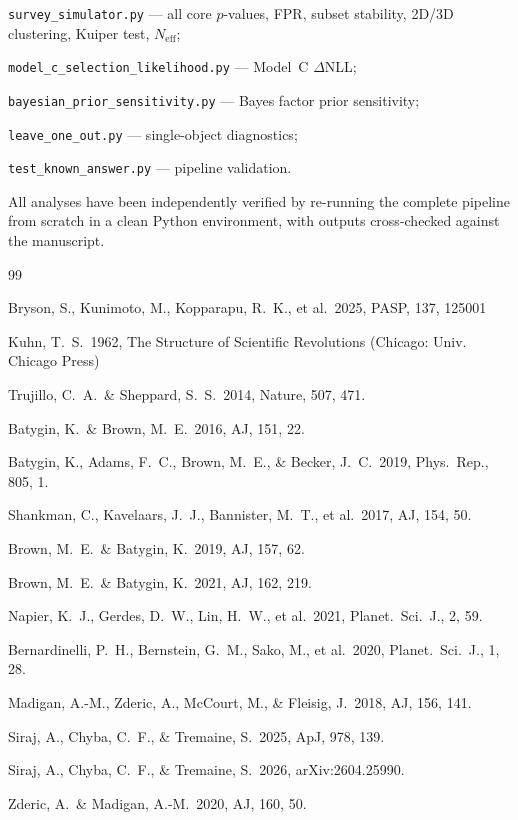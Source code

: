\documentclass[12pt,a4paper]{article}
\begin{document}
\smallskip
\noindent\texttt{survey\_simulator.py} --- all core $p$-values, FPR, subset stability, 2D/3D clustering, Kuiper test, $N_\mathrm{eff}$;

\noindent\texttt{model\_c\_selection\_likelihood.py} --- Model~C $\Delta$NLL;

\noindent\texttt{bayesian\_prior\_sensitivity.py} --- Bayes factor prior sensitivity;

\noindent\texttt{leave\_one\_out.py} --- single-object diagnostics;

\noindent\texttt{test\_known\_answer.py} --- pipeline validation.

\smallskip
\noindent All analyses have been independently verified by re-running the complete pipeline from scratch in a clean Python environment, with outputs cross-checked against the manuscript.

\begin{thebibliography}{99}

 Bryson, S., Kunimoto, M., Kopparapu, R.\ K., et al.\ 2025, PASP, 137, 125001

 Kuhn, T.\ S.\ 1962, The Structure of Scientific Revolutions (Chicago: Univ. Chicago Press)

 Trujillo, C.\ A.\ \& Sheppard, S.\ S.\ 2014, Nature, 507, 471.

 Batygin, K.\ \& Brown, M.\ E.\ 2016, AJ, 151, 22.

 Batygin, K., Adams, F.\ C., Brown, M.\ E., \& Becker, J.\ C.\ 2019, Phys.\ Rep., 805, 1.

 Shankman, C., Kavelaars, J.\ J., Bannister, M.\ T., et al.\ 2017, AJ, 154, 50.

 Brown, M.\ E.\ \& Batygin, K.\ 2019, AJ, 157, 62.

 Brown, M.\ E.\ \& Batygin, K.\ 2021, AJ, 162, 219.

 Napier, K.\ J., Gerdes, D.\ W., Lin, H.\ W., et al.\ 2021, Planet.\ Sci.\ J., 2, 59.

 Bernardinelli, P.\ H., Bernstein, G.\ M., Sako, M., et al.\ 2020, Planet.\ Sci.\ J., 1, 28.

 Madigan, A.-M., Zderic, A., McCourt, M., \& Fleisig, J.\ 2018, AJ, 156, 141.

 Siraj, A., Chyba, C.\ F., \& Tremaine, S.\ 2025, ApJ, 978, 139.

 Siraj, A., Chyba, C.\ F., \& Tremaine, S.\ 2026, arXiv:2604.25990.

 Zderic, A.\ \& Madigan, A.-M.\ 2020, AJ, 160, 50.

\end{thebibliography}
\end{document}
